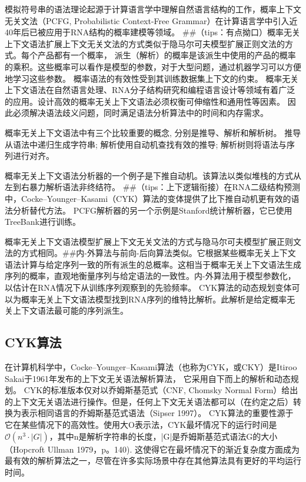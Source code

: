 模拟符号串的语法理论起源于计算语言学中理解自然语言结构的工作\cite{chomsky1956three, chomsky1959certain, lees1957syntactic}，概率上下文无关文法（PCFG, Probabilistic Context-Free Grammar）在计算语言学中引入近40年后已被应用于RNA结构的概率建模等领域\cite{sakakibara1994stochastic}。
##（tips：有点拗口）概率无关上下文语法扩展上下文无关文法的方式类似于隐马尔可夫模型扩展正则文法的方式。每个产品都有一个概率，
派生（解析）的概率是该派生中使用的产品的概率的乘积。这些概率可以看作是模型的参数，对于大型问题，通过机器学习可以方便地学习这些参数。
概率语法的有效性受到其训练数据集上下文的约束。
概率无关上下文语法在自然语言处理、RNA分子结构研究和编程语言设计等领域有着广泛的应用。设计高效的概率无关上下文语法必须权衡可伸缩性和通用性等因素。
因此必须解决语法歧义问题，同时满足语法分析算法中的时间和内存需求。

概率无关上下文语法中有三个比较重要的概念, 分别是推导、解析和解析树。
推导从语法中递归生成字符串; 解析使用自动机查找有效的推导; 解析树则将语法与序列进行对齐。

概率无关上下文语法分析器的一个例子是下推自动机\cite{sippl1999biological}。该算法以类似堆栈的方式从左到右暴力解析语法非终结符。
##（tips：上下逻辑衔接）在RNA二级结构预测中，Cocke–Younger–Kasami（CYK）算法的变体提供了比下推自动机更有效的语法分析替代方法。
PCFG解析器的另一个示例是Stanford统计解析器\cite{klein2003accurate}，它已使用TreeBank进行训练。

概率无关上下文语法模型扩展上下文无关文法的方式与隐马尔可夫模型扩展正则文法的方式相同。##内-外算法与前向-后向算法类似。它根据某些概率无关上下文语法计算与给定序列一致的所有派生的总概率。这相当于概率无关上下文语法生成序列的概率，直观地衡量序列与给定语法的一致性。内-外算法用于模型参数化，以估计在RNA情况下从训练序列观察到的先验频率。
CYK算法的动态规划变体可以为概率无关上下文语法模型找到RNA序列的维特比解析。此解析是给定概率无关上下文语法最可能的序列派生。

\subsection{CYK算法}

在计算机科学中，Cocke–Younger–Kasami算法（也称为CYK，或CKY）是Itiroo Sakai\cite{mey1965international}于1961年发布的上下文无关语法解析算法，
它采用自下而上的解析和动态规划。
CYK的标准版本仅对以乔姆斯基范式（CNF, Chomsky Normal Form）给出的上下文无关语法进行操作。但是，任何上下文无关语法都可以（在约定之后）转换为表示相同语言的乔姆斯基范式语法（Sipser 1997）。
CYK算法的重要性源于它在某些情况下的高效性。使用大O表示法，CYK最坏情况下的运行时间是$\displaystyle \mathcal{O} (n^{3} \cdot |G|)$，其中n是解析字符串的长度，|G|是乔姆斯基范式语法G的大小（Hopcroft Ullman 1979，p。140). 
这使得它在最坏情况下的渐近复杂度方面成为最有效的解析算法之一，尽管在许多实际场景中存在其他算法具有更好的平均运行时间\cite{sipser1997context}。

